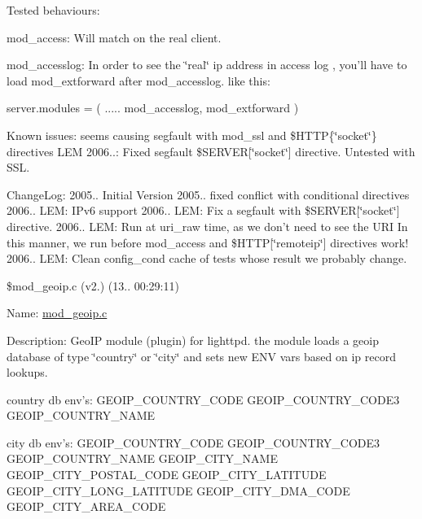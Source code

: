 Tested behaviours\-:

mod\-\_\-access\-: Will match on the real client.

mod\-\_\-accesslog\-: In order to see the \char`\"{}real\char`\"{} ip address in access log , you'll have to load mod\-\_\-extforward after mod\-\_\-accesslog. like this\-:

server.\-modules = ( ..... mod\-\_\-accesslog, mod\-\_\-extforward )

Known issues\-: seems causing segfault with mod\-\_\-ssl and \$\-H\-T\-T\-P\{\char`\"{}socket\char`\"{}\} directives L\-E\-M 2006..\-: Fixed segfault \$\-S\-E\-R\-V\-E\-R\mbox{[}\char`\"{}socket\char`\"{}\mbox{]} directive. Untested with S\-S\-L.

Change\-Log\-: 2005.. Initial Version 2005.. fixed conflict with conditional directives 2006.. L\-E\-M\-: I\-Pv6 support 2006.. L\-E\-M\-: Fix a segfault with \$\-S\-E\-R\-V\-E\-R\mbox{[}\char`\"{}socket\char`\"{}\mbox{]} directive. 2006.. L\-E\-M\-: Run at uri\-\_\-raw time, as we don't need to see the U\-R\-I In this manner, we run before mod\-\_\-access and \$\-H\-T\-T\-P\mbox{[}\char`\"{}remoteip\char`\"{}\mbox{]} directives work! 2006.. L\-E\-M\-: Clean config\-\_\-cond cache of tests whose result we probably change.

\$mod\-\_\-geoip.\-c (v2.) (13.. 00\-:29\-:11)

Name\-: \hyperlink{mod__geoip_8c}{mod\-\_\-geoip.\-c}

Description\-: Geo\-I\-P module (plugin) for lighttpd. the module loads a geoip database of type \char`\"{}country\char`\"{} or \char`\"{}city\char`\"{} and sets new E\-N\-V vars based on ip record lookups.

country db env's\-: G\-E\-O\-I\-P\-\_\-\-C\-O\-U\-N\-T\-R\-Y\-\_\-\-C\-O\-D\-E G\-E\-O\-I\-P\-\_\-\-C\-O\-U\-N\-T\-R\-Y\-\_\-\-C\-O\-D\-E3 G\-E\-O\-I\-P\-\_\-\-C\-O\-U\-N\-T\-R\-Y\-\_\-\-N\-A\-M\-E

city db env's\-: G\-E\-O\-I\-P\-\_\-\-C\-O\-U\-N\-T\-R\-Y\-\_\-\-C\-O\-D\-E G\-E\-O\-I\-P\-\_\-\-C\-O\-U\-N\-T\-R\-Y\-\_\-\-C\-O\-D\-E3 G\-E\-O\-I\-P\-\_\-\-C\-O\-U\-N\-T\-R\-Y\-\_\-\-N\-A\-M\-E G\-E\-O\-I\-P\-\_\-\-C\-I\-T\-Y\-\_\-\-N\-A\-M\-E G\-E\-O\-I\-P\-\_\-\-C\-I\-T\-Y\-\_\-\-P\-O\-S\-T\-A\-L\-\_\-\-C\-O\-D\-E G\-E\-O\-I\-P\-\_\-\-C\-I\-T\-Y\-\_\-\-L\-A\-T\-I\-T\-U\-D\-E G\-E\-O\-I\-P\-\_\-\-C\-I\-T\-Y\-\_\-\-L\-O\-N\-G\-\_\-\-L\-A\-T\-I\-T\-U\-D\-E G\-E\-O\-I\-P\-\_\-\-C\-I\-T\-Y\-\_\-\-D\-M\-A\-\_\-\-C\-O\-D\-E G\-E\-O\-I\-P\-\_\-\-C\-I\-T\-Y\-\_\-\-A\-R\-E\-A\-\_\-\-C\-O\-D\-E

